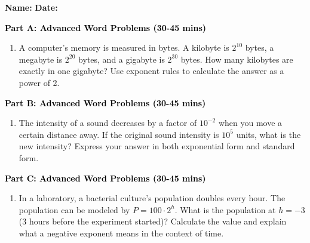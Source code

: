\documentclass[12pt, letterpaper, fleqn]{article}
\begin{document}
\textbf{Name:} \underline{\hspace{5cm}}
\hfill
\textbf{Date:} \underline{\hspace{3cm}}\\


\begin{tcolorbox}[colback=customteal!20]
\large\textcolor{black}{\textbf{Part A: Advanced Word Problems (30-45 mins)}}
\end{tcolorbox}

\vspace{3mm}

\begin{enumerate}[itemsep=5.5cm, leftmargin=0.6cm]
\item A computer's memory is measured in bytes. A kilobyte is $2^{10}$ bytes, a megabyte is $2^{20}$ bytes, and a gigabyte is $2^{30}$ bytes. How many kilobytes are exactly in one gigabyte? Use exponent rules to calculate the answer as a power of 2.
\end{enumerate}

\newpage

\begin{tcolorbox}[colback=customteal!20]
\large\textcolor{black}{\textbf{Part B: Advanced Word Problems (30-45 mins)}}
\end{tcolorbox}

\vspace{3mm}

\begin{enumerate}[itemsep=5.5cm, leftmargin=0.6cm, resume]
\item The intensity of a sound decreases by a factor of $10^{-2}$ when you move a certain distance away. If the original sound intensity is $10^5$ units, what is the new intensity? Express your answer in both exponential form and standard form.
\end{enumerate}

\newpage

\begin{tcolorbox}[colback=customteal!20]
\large\textcolor{black}{\textbf{Part C: Advanced Word Problems (30-45 mins)}}
\end{tcolorbox}

\vspace{3mm}

\begin{enumerate}[itemsep=5.5cm, leftmargin=0.6cm, resume]
\item In a laboratory, a bacterial culture's population doubles every hour. The population can be modeled by $P = 100 \cdot 2^h$. What is the population at $h = -3$ (3 hours before the experiment started)? Calculate the value and explain what a negative exponent means in the context of time.
\end{enumerate}
\end{document}
